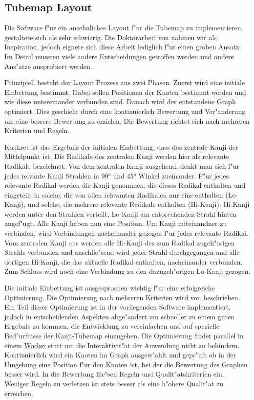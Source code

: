 \subsection{Tubemap Layout}

Die Software f"ur ein ansehnliches Layout f"ur die Tubemap zu
implementieren, gestaltete sich als sehr schwierig. Die Doktorarbeit von
\cite{automaticlayoutmetro08} nahmen wir als Inspiration, jedoch eignete
sich diese Arbeit lediglich f"ur einen groben Ansatz. Im Detail mussten
viele andere Entscheidungen getroffen werden und andere Ans"atze
ausprobiert werden.

Prinzipiell besteht der Layout Prozess aus zwei Phasen. Zuerst wird eine
initiale Einbettung bestimmt. Dabei sollen Positionen der Knoten
bestimmt werden und wie diese untereinander verbunden sind. Danach wird
der entstandene Graph optimiert. Dies geschieht durch eine
kontinuierlich Bewertung und Ver"anderung um eine bessere Bewertung zu
erzielen. Die Bewertung richtet sich nach mehreren Kriterien und Regeln.

Konkret ist das Ergebnis der initialen Einbettung, dass das zentrale
Kanji der Mittelpunkt ist. Die Radikale des zentralen Kanji werden hier als
relevante Radikale bezeichnet. Von dem zentralen Kanji ausgehend, denkt
man sich f"ur jedes relvante Kanji Strahlen in 90° und 45° Winkel
zueinander. F"ur jedes relevante Radikal werden die Kanji genommen, die
dieses Radikal enthalten und eingeteilt in solche, die von allen
relevanten Radikalen nur eins enthalten (Lo-Kanji), und solche, die
mehrere relevante Radikale enthalten (Hi-Kanji). Hi-Kanji werden unter
den Strahlen verteilt, Lo-Kanji am entprechenden Strahl hinten
angef"ugt. Alle Kanji haben nun eine Position. Um Kanji miteinandner
zu verbinden, wird Verbindungen nacheinander gezogen f"ur jedes relevante
Radikal. Vom zentralen Kanji aus werden alle Hi-Kanji des zum Radikal
zugeh"origen Strahls verbunden und anschlie"send wird jeder Strahl
durchgegangen and alle dortigen Hi-Kanji, die das aktuelle Radikal
enthalten, nacheinander verbunden. Zum Schluss wird noch eine Verbindung
zu den dazugeh"origen Lo-Kanji gezogen.

Die initiale Einbettung ist ausgesprochen wichtig f"ur eine erfolgreiche
Optimierung. Die Optimierung nach mehreren Kriterien wird von
\cite{automaticmetromap11} beschrieben. Ein Teil dieser Optimierung ist
in der vorliegenden Software implementiert, jedoch in entscheidenden
Aspekten abge"andert um schneller zu einem guten Ergebnis zu kommen, die
Entwicklung zu vereinfachen und auf spezielle Bed"urfnisse der
Kanji-Tubemap einzugehen. Die Optimierung findet parallel in einem
\href{http://www.whatwg.org/specthes/web-apps/current-work/multipage/workers.html}{Worker}
statt um die Interaktivit"at der Anwendung nicht zu behindern.
Kontinuierlich wird ein Knoten im Graph ausgew"ahlt und gepr"uft ob in der
Umgebung eine Position f"ur den Knoten ist, bei der die Bewertung des
Graphen besser wird. In die Bewertung flie"sen Regeln und
Qualit"atskriterien ein. Weniger Regeln zu verletzen ist stets besser als
eine h"ohere Qualit"at zu erreichen.

